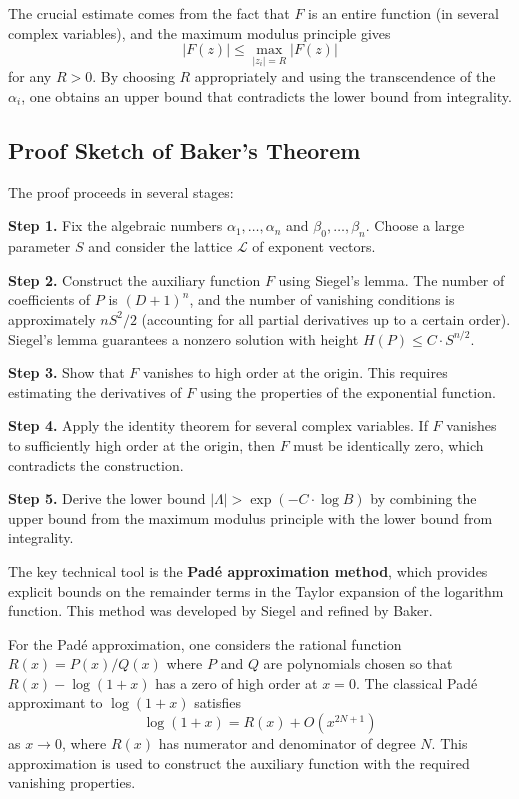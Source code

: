 The crucial estimate comes from the fact that $F$ is an entire function (in several complex variables), and the maximum modulus principle gives
\[
|F(z)| \leq \max_{|z_i| = R} |F(z)|
\]
for any $R > 0$. By choosing $R$ appropriately and using the transcendence of the $\alpha_i$, one obtains an upper bound that contradicts the lower bound from integrality.

\subsection*{Proof Sketch of Baker's Theorem}

The proof proceeds in several stages:

\textbf{Step 1.} Fix the algebraic numbers $\alpha_1, \ldots, \alpha_n$ and $\beta_0, \ldots, \beta_n$. Choose a large parameter $S$ and consider the lattice $\mathcal{L}$ of exponent vectors.

\textbf{Step 2.} Construct the auxiliary function $F$ using Siegel's lemma. The number of coefficients of $P$ is $(D+1)^n$, and the number of vanishing conditions is approximately $nS^2/2$ (accounting for all partial derivatives up to a certain order). Siegel's lemma guarantees a nonzero solution with height $H(P) \leq C \cdot S^{n/2}$.

\textbf{Step 3.} Show that $F$ vanishes to high order at the origin. This requires estimating the derivatives of $F$ using the properties of the exponential function.

\textbf{Step 4.} Apply the identity theorem for several complex variables. If $F$ vanishes to sufficiently high order at the origin, then $F$ must be identically zero, which contradicts the construction.

\textbf{Step 5.} Derive the lower bound $|\Lambda| > \exp(-C \cdot \log B)$ by combining the upper bound from the maximum modulus principle with the lower bound from integrality.

The key technical tool is the \textbf{Pad\'e approximation method}, which provides explicit bounds on the remainder terms in the Taylor expansion of the logarithm function. This method was developed by Siegel and refined by Baker.

For the Pad\'e approximation, one considers the rational function $R(x) = P(x)/Q(x)$ where $P$ and $Q$ are polynomials chosen so that $R(x) - \log(1+x)$ has a zero of high order at $x = 0$. The classical Pad\'e approximant to $\log(1+x)$ satisfies
\[
\log(1+x) = R(x) + O(x^{2N+1})
\]
as $x \to 0$, where $R(x)$ has numerator and denominator of degree $N$. This approximation is used to construct the auxiliary function with the required vanishing properties.

